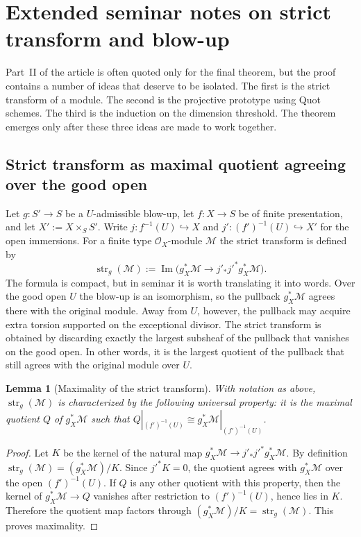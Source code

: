 \documentclass[11pt,oneside]{article}
\newtheorem{lemma}[theorem]{Lemma}
\newcommand{\M}{\mathcal M}
\newcommand{\OO}{\mathcal O}
\newcommand{\Image}{\operatorname{Im}}
\newcommand{\st}{\operatorname{str}}
\begin{document}
\section{Extended seminar notes on strict transform and blow-up}

Part~II of the article is often quoted only for the final theorem, but the proof contains a number of ideas that deserve to be isolated.  The first is the strict transform of a module.  The second is the projective prototype using Quot schemes.  The third is the induction on the dimension threshold.  The theorem emerges only after these three ideas are made to work together.

\subsection{Strict transform as maximal quotient agreeing over the good open}

Let $g\colon S'\to S$ be a $U$-admissible blow-up, let $f\colon X\to S$ be of finite presentation, and let $X':=X\times_S S'$.  Write $j\colon f^{-1}(U)\hookrightarrow X$ and $j'\colon (f')^{-1}(U)\hookrightarrow X'$ for the open immersions.  For a finite type $\OO_X$-module $\M$ the strict transform is defined by
\[
\st_g(\M):=\Image\bigl(g_X^*\M\to j'_*j'^*g_X^*\M\bigr).
\]
The formula is compact, but in seminar it is worth translating it into words.  Over the good open $U$ the blow-up is an isomorphism, so the pullback $g_X^*\M$ agrees there with the original module.  Away from $U$, however, the pullback may acquire extra torsion supported on the exceptional divisor.  The strict transform is obtained by discarding exactly the largest subsheaf of the pullback that vanishes on the good open.  In other words, it is the largest quotient of the pullback that still agrees with the original module over $U$.

\begin{lemma}[Maximality of the strict transform]\label{lem:strict-maximal-long}
With notation as above, $\st_g(\M)$ is characterized by the following universal property: it is the maximal quotient $Q$ of $g_X^*\M$ such that $Q|_{(f')^{-1}(U)}\cong g_X^*\M|_{(f')^{-1}(U)}$.
\end{lemma}

\begin{proof}
Let $K$ be the kernel of the natural map $g_X^*\M\to j'_*j'^*g_X^*\M$.  By definition $\st_g(\M)=(g_X^*\M)/K$.  Since $j'^*K=0$, the quotient agrees with $g_X^*\M$ over the open $(f')^{-1}(U)$.  If $Q$ is any other quotient with this property, then the kernel of $g_X^*\M\to Q$ vanishes after restriction to $(f')^{-1}(U)$, hence lies in $K$.  Therefore the quotient map factors through $(g_X^*\M)/K=\st_g(\M)$.  This proves maximality.
\end{proof}
\end{document}
